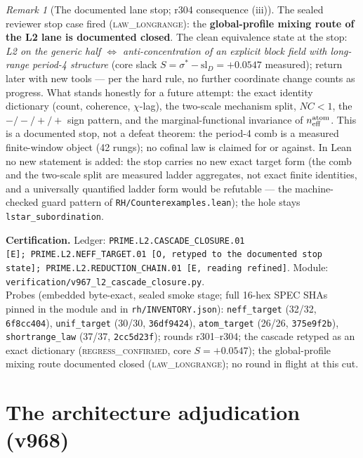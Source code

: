 \documentclass[11pt]{article}
\newcommand{\certbox}[3]{%
  \par\medskip\noindent\colorbox{certgray}{\parbox{\dimexpr\linewidth-2\fboxsep}{%
    \footnotesize\raggedright\textbf{Certification.} Ledger: \texttt{#1}.\quad
    Module: \texttt{#2}.\\ #3}}\par\medskip}
\theoremstyle{definition}
\theoremstyle{remark}
\newtheorem{remark}[theorem]{Remark}
\begin{document}
\begin{remark}[The documented lane stop; r304 consequence (iii)]
\label{rem:lanestop}
The sealed reviewer stop case fired (\textsc{law\_longrange}): the
\textbf{global-profile mixing route of the L2 lane is documented
closed}.  The clean equivalence state at the stop: \emph{L2 on the
generic half $\Leftrightarrow$ anti-concentration of an explicit
block field with long-range period-4 structure} (core slack $S =
\sigma^* - \mathrm{sl}_D = +0.0547$ measured); return later with new
tools --- per the hard rule, no further coordinate change counts as
progress.  What stands honestly for a future attempt: the exact
identity dictionary (count, coherence, $\chi$-lag), the two-scale
mechanism split, $NC < 1$, the $-/-/+/+$ sign pattern, and the
marginal-functional invariance of $n_{\rm eff}^{\rm atom}$.  This is
a documented stop, not a defeat theorem: the period-4 comb is a
measured finite-window object (42 rungs); no cofinal law is claimed
for or against.  In Lean no new statement is added: the stop carries
no new exact target form (the comb and the two-scale split are
measured ladder aggregates, not exact finite identities, and a
universally quantified ladder form would be refutable --- the
machine-checked guard pattern of
\texttt{RH/Counterexamples.lean}); the hole stays
\texttt{lstar\_subordination}.
\end{remark}

\certbox{PRIME.L2.CASCADE\_CLOSURE.01 [E];\
PRIME.L2.NEFF\_TARGET.01 [O, retyped to the documented stop
state];\ PRIME.L2.REDUCTION\_CHAIN.01 [E, reading refined]}%
{verification/v967\_l2\_cascade\_closure.py}%
{Probes (embedded byte-exact, sealed smoke stage; full 16-hex SPEC
SHAs pinned in the module and in \texttt{rh/INVENTORY.json}):
\texttt{neff\_target} (32/32, \texttt{6f8cc404}),
\texttt{unif\_target} (30/30, \texttt{36df9424}),
\texttt{atom\_target} (26/26, \texttt{375e9f2b}),
\texttt{shortrange\_law} (37/37, \texttt{2cc5d23f});
rounds r301--r304; the cascade retyped as an exact dictionary
(\textsc{regress\_confirmed}, core $S = +0.0547$); the
global-profile mixing route documented closed
(\textsc{law\_longrange}); no round in flight at this cut.}

\section{The architecture adjudication (v968)}
\label{sec:architecture-adjudication}
\end{document}
